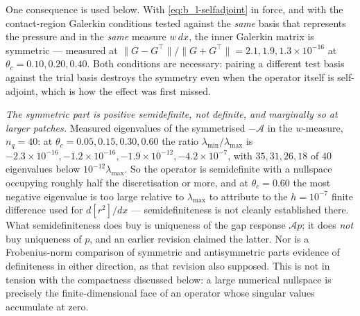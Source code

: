 One consequence is used below. With \eqref{eq:b_l-selfadjoint} in force, and with the contact-region Galerkin conditions tested against the \emph{same} basis that represents the pressure and in the \emph{same} measure $w\,dx$, the inner Galerkin matrix is symmetric --- measured at $\|G-G^{\!\top}\|/\|G+G^{\!\top}\|=2.1,1.9,1.3\times10^{-16}$ at $\theta_c=0.10,0.20,0.40$. Both conditions are necessary: pairing a different test basis against the trial basis destroys the symmetry even when the operator itself is self-adjoint, which is how the effect was first missed.

\emph{The symmetric part is positive semidefinite, not definite, and marginally so at larger patches.} Measured eigenvalues of the symmetrised $-\mathcal A$ in the $w$-measure, $n_q=40$: at $\theta_c=0.05,0.15,0.30,0.60$ the ratio $\lambda_{\min}/\lambda_{\max}$ is $-2.3\times10^{-16},-1.2\times10^{-16},-1.9\times10^{-12},-4.2\times10^{-7}$, with $35,31,26,18$ of $40$ eigenvalues below $10^{-12}\lambda_{\max}$. So the operator is semidefinite with a nullspace occupying roughly half the discretisation or more, and at $\theta_c=0.60$ the most negative eigenvalue is too large relative to $\lambda_{\max}$ to attribute to the $h=10^{-7}$ finite difference used for $d[r^2]/dx$ --- semidefiniteness is not cleanly established there. What semidefiniteness does buy is uniqueness of the gap response $\mathcal Ap$; it does \emph{not} buy uniqueness of $p$, and an earlier revision claimed the latter. Nor is a Frobenius-norm comparison of symmetric and antisymmetric parts evidence of definiteness in either direction, as that revision also supposed. This is not in tension with the compactness discussed below: a large numerical nullspace is precisely the finite-dimensional face of an operator whose singular values accumulate at zero.

